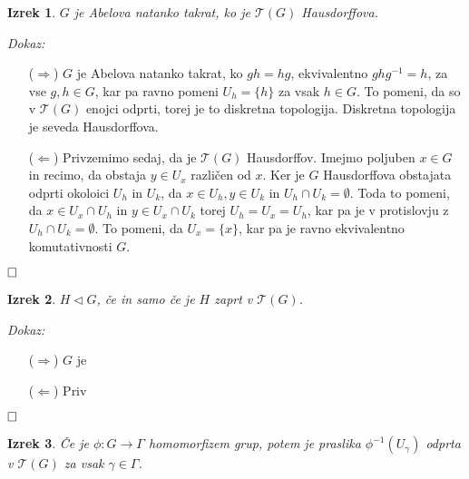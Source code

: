 \documentclass[a4paper,12pt]{article}
\def\qed{$\hfill\Box$}   %
\newtheorem{izrek}{Izrek}
\begin{document}
\begin{izrek}
    $G$ je Abelova natanko takrat, ko je $\mathcal{T}(G)$ Hausdorffova.
\end{izrek}

\noindent
{\em Dokaz:\/}
    \begin{itemize}
        \item[($\Rightarrow$)] $G$ je Abelova natanko takrat, ko $gh = hg $, ekvivalentno $ghg^{-1} = h$, za vse $g,h \in G$, kar pa ravno pomeni $U_h = \{ h\}$ za vsak $h \in G$.
        To pomeni, da so v $\mathcal{T}(G)$ enojci odprti, torej je to diskretna topologija. Diskretna topologija je seveda Hausdorffova.
        \item[($\Leftarrow$)] Privzemimo sedaj, da je $\mathcal{T}(G)$ Hausdorffov. Imejmo poljuben $x \in G$ in recimo, da obstaja $y \in U_x$ različen od $x$.
        Ker je $G$ Hausdorffova obstajata odprti okoloici $U_h$ in $U_k$, da $x \in U_h, y \in U_k$ in $U_h \cap U_k = \emptyset$.
        Toda to pomeni, da $x \in U_x \cap U_h$ in $y \in U_x \cap U_k$ torej $U_h = U_x = U_h$, kar pa je v protislovju z $U_h \cap U_k = \emptyset$.
        To pomeni, da $U_x = \{x\}$, kar pa je ravno ekvivalentno komutativnosti $G$.
    \end{itemize} 
\qed


\begin{izrek}
    $H \triangleleft G$, če in samo če je $H$ zaprt v $\mathcal{T}(G)$.
\end{izrek}

\noindent
{\em Dokaz:\/}
    \begin{itemize}
        \item[($\Rightarrow$)] $G$ je 
        \item[($\Leftarrow$)] Priv
    \end{itemize} 
\qed

\begin{izrek}
    Če je $\phi: G \rightarrow \Gamma$ homomorfizem grup, potem je praslika $\phi^{-1}(U_\gamma)$ odprta v $\mathcal{T}(G)$ za vsak $\gamma \in \Gamma$.
\end{izrek}
\end{document}
